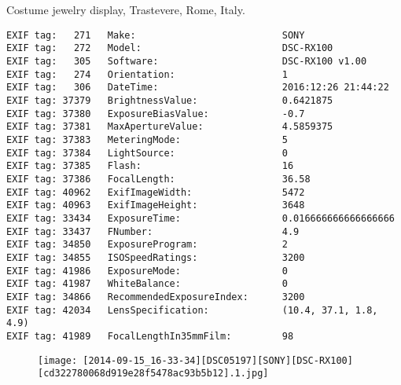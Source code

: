 \section{\protect{}}
\noindent Costume jewelry display, Trastevere, Rome, Italy.
\noindent
\begin{lstlisting}
EXIF tag:   271   Make:                          SONY
EXIF tag:   272   Model:                         DSC-RX100
EXIF tag:   305   Software:                      DSC-RX100 v1.00
EXIF tag:   274   Orientation:                   1
EXIF tag:   306   DateTime:                      2016:12:26 21:44:22
EXIF tag: 37379   BrightnessValue:               0.6421875
EXIF tag: 37380   ExposureBiasValue:             -0.7
EXIF tag: 37381   MaxApertureValue:              4.5859375
EXIF tag: 37383   MeteringMode:                  5
EXIF tag: 37384   LightSource:                   0
EXIF tag: 37385   Flash:                         16
EXIF tag: 37386   FocalLength:                   36.58
EXIF tag: 40962   ExifImageWidth:                5472
EXIF tag: 40963   ExifImageHeight:               3648
EXIF tag: 33434   ExposureTime:                  0.016666666666666666
EXIF tag: 33437   FNumber:                       4.9
EXIF tag: 34850   ExposureProgram:               2
EXIF tag: 34855   ISOSpeedRatings:               3200
EXIF tag: 41986   ExposureMode:                  0
EXIF tag: 41987   WhiteBalance:                  0
EXIF tag: 34866   RecommendedExposureIndex:      3200
EXIF tag: 42034   LensSpecification:             (10.4, 37.1, 1.8, 4.9)
EXIF tag: 41989   FocalLengthIn35mmFilm:         98

\end{lstlisting}
\clearpage
\begin{figure}
\raggedleft
\texttt{[image: [2014-09-15\_16-33-34][DSC05197][SONY][DSC-RX100][cd322780068d919e28f5478ac93b5b12].1.jpg]}
\end{figure}


\clearpage
